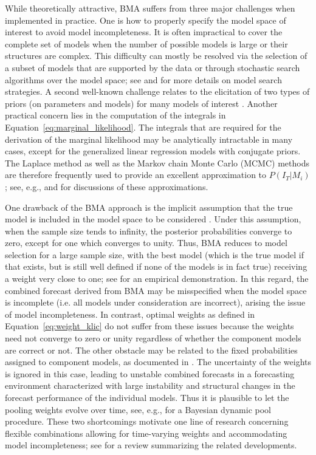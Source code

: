 \documentclass[11pt]{article}
\begin{document}
While theoretically attractive, BMA suffers from three major challenges when implemented in practice. One is how to properly specify the model space of interest to avoid model incompleteness. It is often impractical to cover the complete set of models when the number of possible models is large or their structures are complex. This difficulty can mostly be resolved via the selection of a subset of models that are supported by the data or through stochastic search algorithms over the model space; see \citet{Hoeting1999-qn} and \citet{Koop2003-nl} for more details on model search strategies. A second well-known challenge relates to the elicitation of two types of priors (on parameters and models) for many models of interest \citep{Moral-Benito2015-zh,Aastveit2018-lf}. Another practical concern lies in the computation of the integrals in Equation~\eqref{eq:marginal_likelihood}. The integrals that are required for the derivation of the marginal likelihood may be analytically intractable in many cases, except for the generalized linear regression models with conjugate priors. The Laplace method as well as the Markov chain Monte Carlo (MCMC) methods are therefore frequently used to provide an excellent approximation to $P(I_{T}|M_{i})$; see, e.g., \citet{Hoeting1999-qn} and \citet{Bassetti2020-uh} for discussions of these approximations.

One drawback of the BMA approach is the implicit assumption that the true model is included in the model space to be considered \citep{Wright2008-bs}. Under this assumption, when the sample size tends to infinity, the posterior probabilities converge to zero, except for one which converges to unity. Thus, BMA reduces to model selection for a large sample size, with the best model (which is the true model if that exists, but is still well defined if none of the models is in fact true) receiving a weight very close to one; see \citet{Geweke2010-zn} for an empirical demonstration. In this regard, the combined forecast derived from BMA may be misspecified when the model space is incomplete (i.e. all models under consideration are incorrect), arising the issue of model incompleteness. In contrast, optimal weights as defined in Equation~\eqref{eq:weight_klic} do not suffer from these issues because the weights need not converge to zero or unity regardless of whether the component models are correct or not. The other obstacle may be related to the fixed probabilities assigned to component models, as documented in \citet{Aastveit2018-lf}. The uncertainty of the weights is ignored in this case, leading to unstable combined forecasts in a forecasting environment characterized with large instability and structural changes in the forecast performance of the individual models. Thus it is plausible to let the pooling weights evolve over time, see, e.g., \citet{Del_Negro2016-ab} for a Bayesian dynamic pool procedure. These two shortcomings motivate one line of research concerning flexible combinations allowing for time-varying weights and accommodating model incompleteness; see \citet{Aastveit2018-lf} for a review summarizing the related developments.
\end{document}
